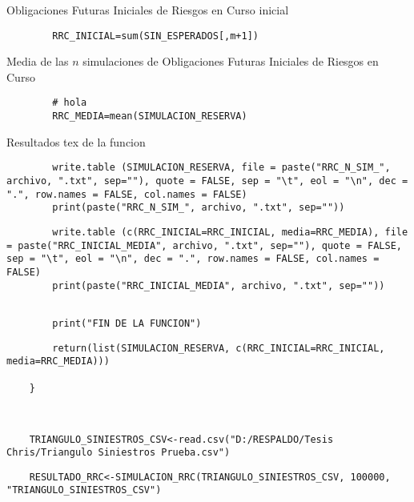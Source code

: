 \documentclass[11pt,twoside,openright,spanish]{report}
\numberwithin{equation}{chapter}
\numberwithin{figure}{chapter}
\numberwithin{table}{chapter}
\begin{document}
\vspace{0.3cm}
Obligaciones Futuras Iniciales de Riesgos en Curso inicial
\begin{lstlisting}			
		RRC_INICIAL=sum(SIN_ESPERADOS[,m+1])
\end{lstlisting}

\vspace{0.3cm}
Media de las $n$ simulaciones de Obligaciones Futuras Iniciales de Riesgos en Curso
\begin{lstlisting}		
		# hola	
		RRC_MEDIA=mean(SIMULACION_RESERVA)
\end{lstlisting}

\vspace{0.3cm}
Resultados tex de la funcion
\begin{lstlisting}			
		write.table (SIMULACION_RESERVA, file = paste("RRC_N_SIM_", archivo, ".txt", sep=""), quote = FALSE, sep = "\t", eol = "\n", dec = ".", row.names = FALSE, col.names = FALSE)
		print(paste("RRC_N_SIM_", archivo, ".txt", sep=""))
\end{lstlisting}

\begin{lstlisting}			
		write.table (c(RRC_INICIAL=RRC_INICIAL, media=RRC_MEDIA), file = paste("RRC_INICIAL_MEDIA", archivo, ".txt", sep=""), quote = FALSE, sep = "\t", eol = "\n", dec = ".", row.names = FALSE, col.names = FALSE)
		print(paste("RRC_INICIAL_MEDIA", archivo, ".txt", sep=""))
\end{lstlisting}

\begin{lstlisting}			
		
		print("FIN DE LA FUNCION")
\end{lstlisting}

\begin{lstlisting}			
		return(list(SIMULACION_RESERVA, c(RRC_INICIAL=RRC_INICIAL, media=RRC_MEDIA)))
		
	}
	
\end{lstlisting}

\begin{lstlisting}		
	
	TRIANGULO_SINIESTROS_CSV<-read.csv("D:/RESPALDO/Tesis Chris/Triangulo Siniestros Prueba.csv")
\end{lstlisting}

\begin{lstlisting}		
	RESULTADO_RRC<-SIMULACION_RRC(TRIANGULO_SINIESTROS_CSV, 100000, "TRIANGULO_SINIESTROS_CSV")
\end{lstlisting}

	
	\pagestyle{empty}

	
\end{document}
